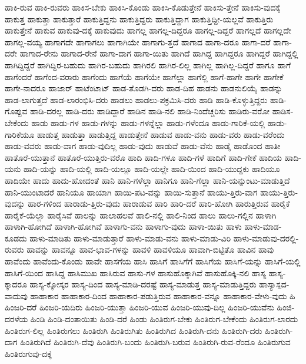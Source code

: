 {ಹಾಕಿ-ರುವ
ಹಾಕಿ-ರುವರು
ಹಾಕಿಸ-ಬೇಕು
ಹಾಕಿಸಿ-ಕೊಂಡು
ಹಾಕಿಸಿ-ಕೊಡುತ್ತೇನೆ
ಹಾಕಿಸು-ತ್ತೇನೆ
ಹಾಕಿಸು-ವುದಕ್ಕೆ
ಹಾಕುತ್ತ
ಹಾಕುತ್ತಾ
ಹಾಕುತ್ತಾರೆ
ಹಾಕುತ್ತಿದ್ದನು
ಹಾಕುತ್ತಿದ್ದರು
ಹಾಕುತ್ತಿದ್ದಾಗ
ಹಾಕುತ್ತಿದ್ದೀ-ಯಲ್ಲವೆ
ಹಾಕುತ್ತಿರು
ಹಾಕುತ್ತೇನೆ
ಹಾಕುವ
ಹಾಕುವು-ದಕ್ಕೆ
ಹಾಕುವುದು
ಹಾಗಲ್ಲ
ಹಾಗಲ್ಲ-ದಿದ್ದರೂ
ಹಾಗಲ್ಲ-ದಿದ್ದರೆ
ಹಾಗಲ್ಲದೆ
ಹಾಗಲ್ಲದೇ
ಹಾಗಲ್ಲ-ವಯ್ಯ
ಹಾಗಾಗದೇ
ಹಾಗಾಗಲು
ಹಾಗಾಗಿಯೇ
ಹಾಗಾಗು-ತ್ತದೆ
ಹಾಗಾದ
ಹಾಗಾ-ದರೂ
ಹಾಗಾ-ದರೆ
ಹಾಗಾ-ದರೇ
ಹಾಗಾದ-ರೇನು
ಹಾಗಾದ-ರೇನೆ
ಹಾಗಾ-ದಾಗ
ಹಾಗಾ-ಯಿತು
ಹಾಗಿದೆ
ಹಾಗಿದ್ದ
ಹಾಗಿದ್ದರೂ
ಹಾಗಿದ್ದರೆ
ಹಾಗಿದ್ದಲ್ಲಿ
ಹಾಗಿದ್ದಿದ್ದರೆ
ಹಾಗಿದ್ದಿರ-ಬಹುದು
ಹಾಗಿರ-ಬಹುದು
ಹಾಗಿರಲಿ
ಹಾಗಿರ-ಲಿಲ್ಲ
ಹಾಗಿಲ್ಲ
ಹಾಗಿಲ್ಲ-ದಿದ್ದರೆ
ಹಾಗೂ
ಹಾಗೆ
ಹಾಗೆಂದರೆ
ಹಾಗೆಂದ-ವರಾರು
ಹಾಗೆಂದು
ಹಾಗೆಯೆ
ಹಾಗೆಯೇ
ಹಾಗೆಲ್ಲಾ
ಹಾಗೆಲ್ಲಿ
ಹಾಗೆ-ಹಾಗೇ
ಹಾಗೇ
ಹಾಗೇಕೆ
ಹಾಗೇ-ನಾದರೂ
ಹಾಜಾರ್
ಹಾಟೆಂಟಾಟ್
ಹಾಡ-ತೊಡಗಿ-ದರು
ಹಾಡ-ದಿಹ
ಹಾಡನು
ಹಾಡನುಲಿಯೈ
ಹಾಡನ್ನು
ಹಾಡ-ಲಾಗುತ್ತದೆ
ಹಾಡ-ಲಾರಂಭಿಸಿ-ದರು
ಹಾಡಲು
ಹಾಡಲು-ಪಕ್ರಮಿಸಿ-ದರು
ಹಾಡಿ
ಹಾಡಿ-ಕೊಳ್ಳುತ್ತಿದ್ದರು
ಹಾಡಿ-ಗೊಪ್ಪುವ
ಹಾಡಿ-ದರಲ್ಲ
ಹಾಡಿ-ದರು
ಹಾಡಿದ್ದಾರೆ
ಹಾಡಿನ
ಹಾಡಿ-ನಲಿ
ಹಾಡಿ-ನಿಂದೆಚ್ಚರಿಸು
ಹಾಡಿರು-ವರೋ
ಹಾಡಿಸ-ಬೇಕೆಂದು
ಹಾಡು
ಹಾಡು-ಗಳ
ಹಾಡು-ಗಳನ್ನು
ಹಾಡು-ಗಳನ್ನೆಲ್ಲಾ
ಹಾಡು-ಗಳೆಂದೂ
ಹಾಡು-ಗಾರಿಕೆ-ಯಲ್ಲಿ
ಹಾಡು-ಗಾರಿಕೆಯೂ
ಹಾಡುತ್ತ
ಹಾಡುತ್ತಾ
ಹಾಡುತ್ತಿದ್ದ
ಹಾಡುತ್ತೇನೆ
ಹಾಡುವ
ಹಾಡು-ವನು
ಹಾಡು-ವರು
ಹಾಡು-ವರೆಂದು
ಹಾಡು-ವವರು
ಹಾಡು-ವಾಗ
ಹಾಡು-ವುದಿಲ್ಲ
ಹಾಡು-ವುದು
ಹಾಡುವೆ
ಹಾಡು-ವೆನು
ಹಾಡೈ
ಹಾಡೊಂದ
ಹಾತೀ
ಹಾತೊರೆ-ಯುತ್ತಾನೆ
ಹಾತೊರೆ-ಯುತ್ತಿರು-ವರೊ
ಹಾದಿ
ಹಾದಿ-ಗಳೂ
ಹಾದಿ-ಗಳೆ
ಹಾದಿಗೆ
ಹಾದಿ-ಗೇಕೆ
ಹಾದಿಯ
ಹಾದಿ-ಯನು
ಹಾದಿ-ಯನ್ನು
ಹಾದಿ-ಯಲ್ಲಿ
ಹಾದಿ-ಯಲ್ಲೂ
ಹಾದಿ-ಯಲ್ಲೇ
ಹಾದಿ-ಯಿಂದ
ಹಾದಿ-ಯುದ್ದಕು
ಹಾದಿಯೂ
ಹಾದಿಯೇ
ಹಾದು
ಹಾದು-ಹೋದಂತೆ
ಹಾನಿ
ಹಾನಿ-ಗಳೆಲ್ಲಾ
ಹಾನಿಗೂ
ಹಾನಿ-ಗೆಲ್ಲಾ
ಹಾನಿ-ಯನ್ನುಂಟು-ಮಾಡುತ್ತಿದೆ
ಹಾನಿ-ಯುಂಟಾದರೆ
ಹಾನಿಯೂ
ಹಾಯಾಗಿ
ಹಾಯಿ-ಪಟ-ವನ್ನು
ಹಾಯಿ-ಸುತ್ತಾನೆ
ಹಾಯು-ತ್ತಿರು-ವಾಗ
ಹಾಯು-ತ್ತಿರು-ವುದನ್ನು
ಹಾರ-ಗಳಿಂದ
ಹಾರಾಡು-ತ್ತಿರು-ವುದು
ಹಾರಾಡುವ
ಹಾರಿ
ಹಾರಿ-ದರೆ
ಹಾರಿ-ಹೋಗಿ
ಹಾರುತ್ತಿರುವ
ಹಾರೈಕೆ
ಹಾರೈಕೆ-ಯೆಲ್ಲಾ
ಹಾರೈಸಿವೆ
ಹಾಲನ್ನು
ಹಾಲಾಹಲವೆ
ಹಾಲಿ-ನಲ್ಲಿ
ಹಾಲಿ-ನಿಂದ
ಹಾಲು
ಹಾಲು-ಗಲ್ಲಿನ
ಹಾಳಾಗಿ
ಹಾಳಾಗಿ-ಹೋಗಿದೆ
ಹಾಳಾಗಿ-ಹೋಗಿವೆ
ಹಾಳಾಗು-ವನು
ಹಾಳಾಗು-ವುದು
ಹಾಳಾ-ಯಿತು
ಹಾಳು
ಹಾಳು-ಮಾಡ-ಕೂಡದು
ಹಾಳು-ಮಾಡಿತು
ಹಾಳು-ಮಾಡುತ್ತಾರೆ
ಹಾಳು-ಮಾಡು-ವನು
ಹಾಳು-ಮಾಡು-ವಿರಿ
ಹಾಳು-ಮಾಡುವು-ದರಲ್ಲಿ-ರುವರು
ಹಾವನ್ನು
ಹಾವನ್ನೂ
ಹಾವ-ಭಾವ-ಗಳನ್ನು
ಹಾವಳಿ
ಹಾವಳಿಯೂ
ಹಾವಾಗಿ-ಬಿಟ್ಟಿತೊ
ಹಾವಿನ
ಹಾವು
ಹಾವೆಂದು
ಹಾವೆಂದು-ಕೊಂಡು
ಹಾವೇ
ಹಾಸಗೆಯ
ಹಾಸಿ
ಹಾಸಿಗೆ
ಹಾಸಿಗೆಗೆ
ಹಾಸಿಗೆಯ
ಹಾಸಿಗೆ-ಯನ್ನು
ಹಾಸಿಗೆ-ಯಲ್ಲಿ
ಹಾಸಿಗೆ-ಯಿಂದ
ಹಾಸಿದ್ದ
ಹಾಸಿಮುಖ
ಹಾಸಿರುವ
ಹಾಸು-ಗಳ
ಹಾಸುಹೊಕ್ಕಾಗಿವೆ
ಹಾಸುಹೊಕ್ಕಿ-ನಲಿ
ಹಾಸ್ಯ
ಹಾಸ್ಯ-ಕ್ಕಾದರೂ
ಹಾಸ್ಯ-ಕ್ಕೋಸ್ಕರ
ಹಾಸ್ಯ-ದಿಂದ
ಹಾಸ್ಯ-ಮಾಡಿ-ದರಷ್ಟೆ
ಹಾಸ್ಯ-ಮಾಡುತ್ತ
ಹಾಸ್ಯ-ಮಾಡುತ್ತಿದ್ದರು
ಹಾಸ್ಯಾಸ್ಪದ-ವಾದುವು
ಹಾಹಾಕಾರ
ಹಾಹಾಕಾರ-ದಿಂದ
ಹಾಹಾಕಾರ-ಪಡುತ್ತಿರುವ
ಹಾಹಾಕಾರ-ವನ್ನೂ
ಹಾಹಾಕಾರ-ವೇಳು-ವುದು
ಹಿ
ಹಿಂಜರಿ-ದರೆ
ಹಿಂಜರಿ-ಯದಿರು
ಹಿಂಜರಿ-ಯುತ್ತಾ
ಹಿಂಜರಿ-ಯುವ
ಹಿಂಜರಿ-ಯುವು-ದಿಲ್ಲ
ಹಿಂಜರಿ-ಯುವೆನು
ಹಿಂಜಿ-ದರಳೆಯ
ಹಿಂಡಿ
ಹಿಂಡಿ-ದಂತಾಯಿತು
ಹಿಂಡಿ-ದರೆ
ಹಿಂಡು
ಹಿಂತಿರುಗ-ಬೇಕು
ಹಿಂತಿರುಗ-ಬೇಕೆಂದು
ಹಿಂತಿರುಗ-ಲಾರದು
ಹಿಂತಿರುಗ-ಲಿಲ್ಲ
ಹಿಂತಿರುಗಲು
ಹಿಂತಿರುಗಿ
ಹಿಂತಿರುಗಿತು
ಹಿಂತಿರುಗಿದ
ಹಿಂತಿರುಗಿ-ದನು
ಹಿಂತಿರುಗಿ-ದರು
ಹಿಂತಿರುಗಿ-ದಾಗ
ಹಿಂತಿರುಗಿದೆ
ಹಿಂತಿರುಗಿ-ದೆವು
ಹಿಂತಿರುಗಿ-ಬಂದು
ಹಿಂತಿರುಗಿ-ಬರುವ
ಹಿಂತಿರುಗಿ-ರುವ-ರೆಂದೂ
ಹಿಂತಿರುಗುವ
ಹಿಂತಿರುಗುವು-ದಕ್ಕೆ
}
